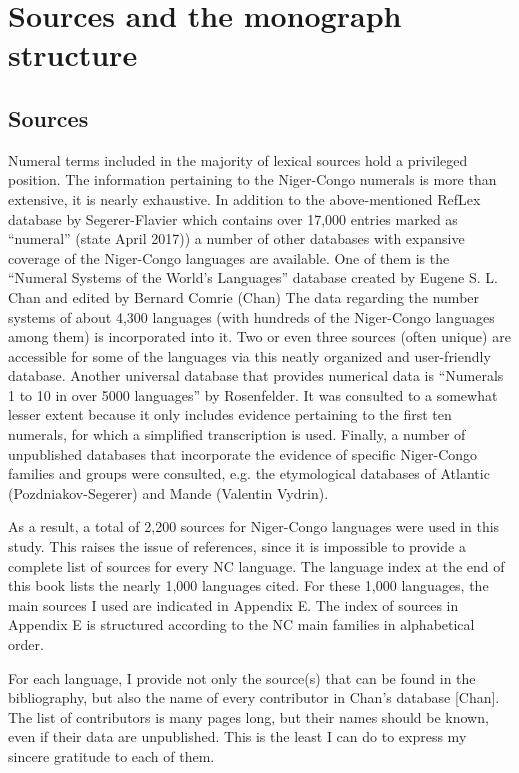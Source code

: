 \section{Sources and the monograph structure}

\subsection{Sources}
Numeral terms included in the majority of lexical sources hold a privileged position. The information pertaining to the Niger-Congo numerals is more than extensive, it is nearly exhaustive. In addition to the above-mentioned RefLex database by Segerer-Flavier which contains over 17,000 entries marked as “numeral” (state  {April 2017)}) a number of other databases with expansive coverage of the Niger-Congo languages are available. One of them is the “Numeral Systems of the World's Languages” database created by Eugene S. L. Chan and edited by Bernard Comrie (Chan) The data regarding the number systems of about 4,300 languages (with hundreds of the Niger-Congo languages among them) is incorporated into it. Two or even three sources (often unique) are accessible for some of the languages via this neatly organized and user-friendly database. Another universal database that provides numerical data is “Numerals 1 to 10 in over 5000 languages” by Rosenfelder. It was consulted to a somewhat lesser extent because it only includes evidence pertaining to the first ten numerals, for which a simplified transcription is used. Finally, a number of unpublished databases that incorporate the evidence of specific Niger-Congo families and groups  were consulted, e.g. the etymological databases of Atlantic (Pozdniakov-Segerer) and Mande (Valentin Vydrin). 

As a result, a total of 2,200 sources for Niger-Congo languages were used in this study. This raises the issue of references, since it is impossible to provide a complete list of sources for every NC language. The language index at the end of this book lists the nearly 1,000 languages cited. For these 1,000 languages, the main sources I used are indicated in Appendix E. The index of sources in Appendix E is structured according to the NC main families in alphabetical order. 

For each language, I provide not only the source(s) that can be found in the bibliography, but also the name of every contributor in Chan’s database [Chan]. The list of contributors is many pages long, but their names should be known, even if their data are unpublished. This is the least I can do to express my sincere gratitude to each of them.

